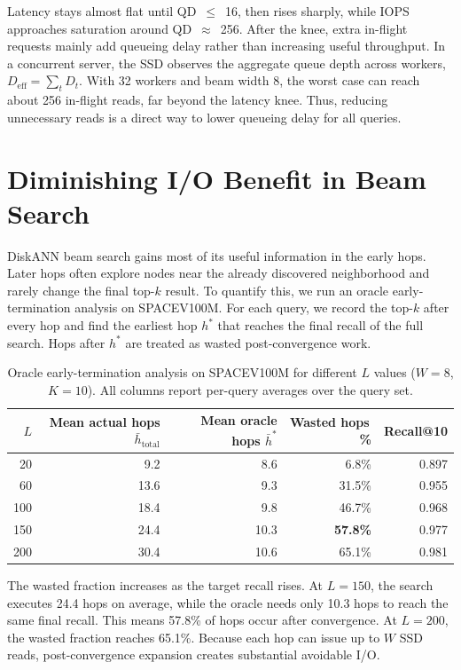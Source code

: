 Latency stays almost flat until QD~$\leq$~16, then rises sharply, while IOPS approaches saturation around QD~$\approx$~256.
After the knee, extra in-flight requests mainly add queueing delay rather than increasing useful throughput.
In a concurrent server, the SSD observes the aggregate queue depth across workers, $D_\text{eff}=\sum_t D_t$.
With 32 workers and beam width 8, the worst case can reach about 256 in-flight reads, far beyond the latency knee.
Thus, reducing unnecessary reads is a direct way to lower queueing delay for all queries.

\section{Diminishing I/O Benefit in Beam Search}
\label{sec:mot-diminishing}

DiskANN beam search gains most of its useful information in the early hops.
Later hops often explore nodes near the already discovered neighborhood and rarely change the final top-$k$ result.
To quantify this, we run an oracle early-termination analysis on SPACEV100M.
For each query, we record the top-$k$ after every hop and find the earliest hop $h^*$ that reaches the final recall of the full search.
Hops after $h^*$ are treated as wasted post-convergence work.

\begin{table}[h]
\centering
\caption[Oracle early-termination analysis on SPACEV100M]{Oracle early-termination analysis on SPACEV100M for different $L$ values ($W = 8$, $K = 10$). All columns report per-query averages over the query set.}
\label{tab:oracle-summary}
\begin{tabular}{rrrrr}
\hline
$L$ & Mean actual hops $\bar h_\text{total}$ & Mean oracle hops $\bar h^*$ & Wasted hops\,\% & Recall@10 \\
\hline
 20 &  9.2 &  8.6 &  6.8\% & 0.897 \\
 60 & 13.6 &  9.3 & 31.5\% & 0.955 \\
100 & 18.4 &  9.8 & 46.7\% & 0.968 \\
150 & 24.4 & 10.3 & \textbf{57.8\%} & 0.977 \\
200 & 30.4 & 10.6 & 65.1\% & 0.981 \\
\hline
\end{tabular}
\end{table}

The wasted fraction increases as the target recall rises.
At $L=150$, the search executes 24.4 hops on average, while the oracle needs only 10.3 hops to reach the same final recall.
This means 57.8\% of hops occur after convergence.
At $L=200$, the wasted fraction reaches 65.1\%.
Because each hop can issue up to $W$ SSD reads, post-convergence expansion creates substantial avoidable I/O.

